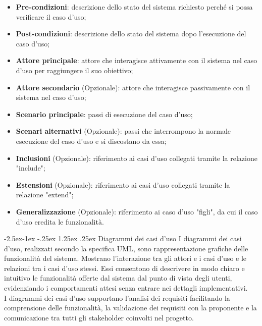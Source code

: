 \documentclass[a4paper,12pt]{article}
\makeatletter
\renewcommand\paragraph{\@startsection{paragraph}{4}{\z@}%
            {-2.5ex\@plus -1ex \@minus -.25ex}%
            {1.25ex \@plus .25ex}%
            {\normalfont\normalsize\bfseries}}
\makeatother
\begin{document}
                \begin{itemize}
                    \item \textbf{Pre-condizioni}: descrizione dello stato del sistema richiesto perché si possa verificare il caso d'uso;
                    \item \textbf{Post-condizioni}: descrizione dello stato del sistema dopo l'esecuzione del caso d'uso;
                    \item \textbf{Attore principale}: attore che interagisce attivamente con il sistema nel caso d'uso per raggiungere il suo obiettivo;
                    \item \textbf{Attore secondario} (Opzionale): attore che interagisce passivamente con il sistema nel caso d'uso;
                    \item \textbf{Scenario principale}: passi di esecuzione del caso d'uso;
                    \item \textbf{Scenari alternativi} (Opzionale): passi che interrompono la normale esecuzione del caso d'uso e si discostano da essa;
                    \item \textbf{Inclusioni} (Opzionale): riferimento ai casi d'uso collegati tramite la relazione "include";
                    \item \textbf{Estensioni} (Opzionale): riferimento ai casi d'uso collegati tramite la relazione "extend";
                    \item \textbf{Generalizzazione} (Opzionale): riferimento ai caso d'uso "figli", da cui il caso d'uso eredita le funzionalità.
                \end{itemize}

            \paragraph{Diagrammi dei casi d'uso}
                I diagrammi dei casi d'uso, realizzati secondo la specifica UML, sono rappresentazione grafiche delle funzionalità del sistema.
                Mostrano l'interazione tra gli attori e i casi d'uso e le relazioni tra i casi d'uso stessi.
                Essi consentono di descrivere in modo chiaro e intuitivo le funzionalità offerte dal sistema dal punto di vista degli utenti, evidenziando i comportamenti attesi senza entrare nei dettagli implementativi.\\
                I diagrammi dei casi d'uso supportano l'analisi dei requisiti facilitando la comprensione delle funzionalità, la validazione dei requisiti con la proponente e la comunicazione tra tutti gli stakeholder coinvolti nel progetto.
\end{document}

